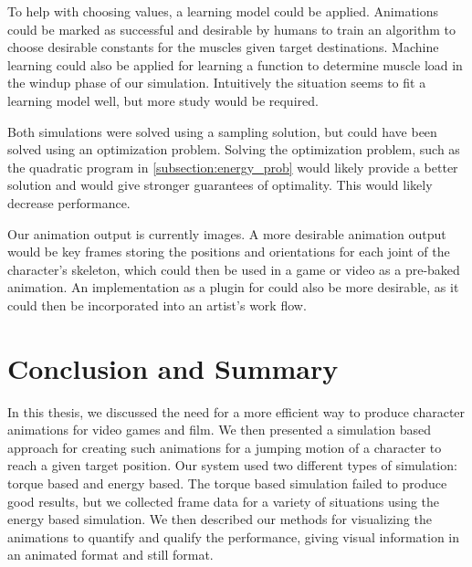 To help with choosing values, a learning model could be applied.  Animations could be marked as successful and desirable by humans to train an algorithm to choose desirable constants for the muscles given target destinations.  Machine learning could also be applied for learning a function to determine muscle load in the windup phase of our simulation.  Intuitively the situation seems to fit a learning model well, but more study would be required.

Both simulations were solved using a sampling solution, but could have been solved using an optimization problem.  Solving the optimization problem, such as the quadratic program in \ref{subsection:energy_prob} would likely provide a better solution and would give stronger guarantees of optimality.  This would likely decrease performance.

Our animation output is currently images.  A more desirable animation output would be key frames storing the positions and orientations for each joint of the character's skeleton, which could then be used in a game or video as a pre-baked animation.  An implementation as a plugin for \maya could also be more desirable, as it could then be incorporated into an artist's work flow.

\section{Conclusion and Summary}
\label{section:conclusion}

In this thesis, we discussed the need for a more efficient way to produce character animations for video games and film.  We then presented a simulation based approach for creating such animations for a jumping motion of a character to reach a given target position.  Our system used two different types of simulation: torque based and energy based.  The torque based simulation failed to produce good results, but we collected frame data for a variety of situations using the energy based simulation.  We then described our methods for visualizing the animations to quantify and qualify the performance, giving visual information in an animated format and still format.

